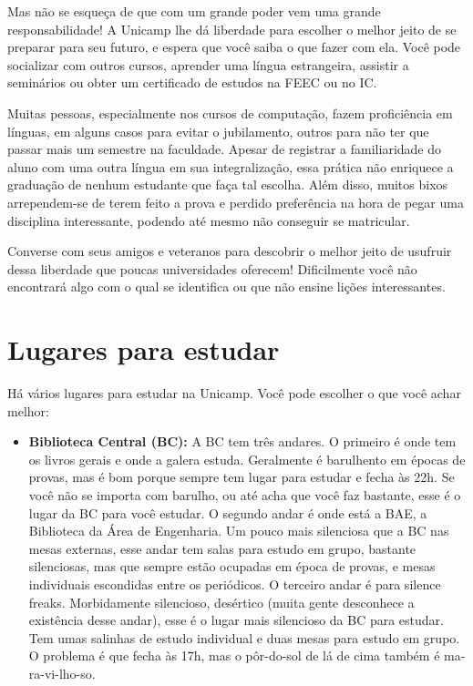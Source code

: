 Mas não se esqueça de que com um grande poder vem uma grande responsabilidade!
A Unicamp lhe dá liberdade para escolher o melhor jeito de se preparar para seu
futuro, e espera que você saiba o que fazer com ela. Você pode socializar com
outros cursos, aprender uma língua estrangeira, assistir a seminários ou obter
um certificado de estudos na FEEC ou no IC.

Muitas pessoas, especialmente nos cursos de computação, fazem proficiência em
línguas, em alguns casos para evitar o jubilamento, outros para não ter que
passar mais um semestre na faculdade. Apesar de registrar a familiaridade do
aluno com uma outra língua em sua integralização, essa prática não enriquece
a graduação de nenhum estudante que faça tal escolha. Além disso, muitos bixos
arrependem-se de terem feito a prova e perdido preferência na hora de pegar uma
disciplina interessante, podendo até mesmo não conseguir se matricular.

Converse com seus amigos e veteranos para descobrir o melhor jeito de usufruir
dessa liberdade que poucas universidades oferecem! Dificilmente você não
encontrará algo com o qual se identifica ou que não ensine lições interessantes.

\section{Lugares para estudar}

Há vários lugares para estudar na Unicamp. Você pode escolher o que você achar
melhor:

\begin{itemize}
\item  \textbf{Biblioteca Central (BC):} A BC tem três andares. O primeiro é onde tem os livros gerais e onde a galera estuda. Geralmente é barulhento em épocas de provas, mas é bom porque sempre tem lugar para estudar e fecha às 22h. Se você não se importa com barulho, ou até acha que você faz bastante, esse é o lugar da BC para você estudar. O segundo andar é onde está a BAE, a Biblioteca da Área de Engenharia. Um pouco mais silenciosa que a BC nas mesas externas, esse andar tem salas para estudo em grupo, bastante silenciosas, mas que sempre estão ocupadas em época de provas, e mesas individuais escondidas entre os periódicos. O terceiro andar é para silence freaks. Morbidamente silencioso, desértico (muita gente desconhece a existência desse andar), esse é o lugar mais silencioso da BC para estudar. Tem umas salinhas de estudo individual e duas mesas para estudo em grupo. O problema é que fecha às 17h, mas o pôr-do-sol de lá de cima também é ma-ra-vi-lho-so.
\end{itemize}

